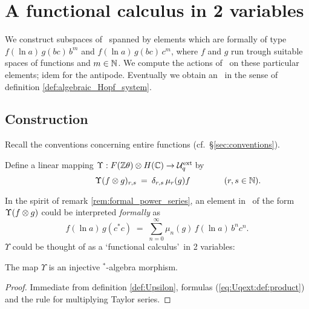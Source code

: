 

\section{A functional calculus in 2 variables}
\label{par:Uqext:interesting_subalgebras}


\begin{abs_chp}
  We construct subspaces of \Uqext\ spanned by elements which are formally of type
  $f(\ln a)\, g(bc)\, b^m$ and $f(\ln a)\, g(bc)\, c^m$, where
  $f$ and $g$ run trough suitable spaces of functions and $m\in \mathbb{N}$.
  We compute the actions of \Aq\ on these particular elements;
  idem for the antipode. Eventually we obtain an \ahss\ in the
  sense of definition \ref{def:algebraic_Hopf_system}\@.
\end{abs_chp}


\subsection{Construction}
Recall the conventions concerning entire functions (cf.\ \S \ref{sec:conventions}).

\begin{defn*}  \label{def:Upsilon}
Define a linear mapping $\Upsilon : F(\mathbb{Z} \theta) \otimes H(\mathbb{C}) \rightarrow {\mathcal U}_q^{\rm ext}\!$ by
$$  \hspace{5em}
    \Upsilon(f \otimes g)_{r,s} \:=\: \delta_{r,s}\, \mu_r(g) f
    \hspace{4em} (r,s \in \mathbb{N}). $$
\end{defn*}


\begin{remark} \rm
  In the spirit of remark \ref{rem:formal_power_series},
  an element in \Uqext\ of the form $\Upsilon(f \otimes g)$
  could be interpreted {\em formally\/} as
  $$ f(\ln a)\, g(c^* c) \;=\; \sum_{n=0}^\infty \mu_n(g)\,f(\ln a)\, b^n c^n.  $$
  $\Upsilon$ could be thought of as a \lq functional calculus\rq\
  in 2 variables:
\end{remark}


\begin{prop} \label{prop:Upsilon:morphism}
  The map\/ $\Upsilon$ is an injective $^*$-algebra morphism.
\end{prop}
\begin{proof}
  Immediate from definition \ref{def:Upsilon}, formulas (\ref{eq:Uqext:def:product}) and
  the rule for multiplying Taylor series.
\end{proof}
\vspace{2ex}



